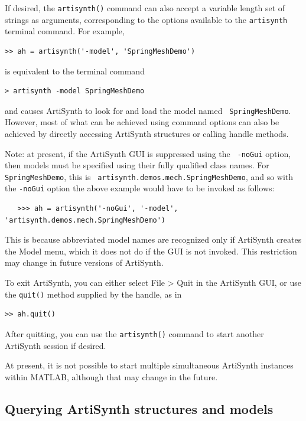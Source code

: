 \documentclass{article}
\begin{document}
If desired, the {\tt artisynth()} command can also accept a variable
length set of strings as arguments, corresponding to the
options available to the {\tt artisynth} terminal command.  For
example,
%
\begin{lstlisting}[]
  >> ah = artisynth('-model', 'SpringMeshDemo')
\end{lstlisting}
%
is equivalent to the terminal command
%
\begin{lstlisting}[]
  > artisynth -model SpringMeshDemo
\end{lstlisting}
%
and causes ArtiSynth to look for and load the model named {\tt
SpringMeshDemo}. However, most of what can be achieved using command
options can also be achieved by directly accessing ArtiSynth
structures or calling handle methods.

%
\begin{sideblock}
Note: at present, if the ArtiSynth GUI is suppressed using the {\tt
-noGui} option, then models must be specified using their fully
qualified class names. For {\tt SpringMeshDemo}, this is {\tt
artisynth.demos.mech.SpringMeshDemo}, and so with the {\tt -noGui}
option the above example would have to be invoked as follows:
%
\begin{verbatim}
   >>> ah = artisynth('-noGui', '-model', 'artisynth.demos.mech.SpringMeshDemo')
\end{verbatim}
%
This is because abbreviated model names are recognized only if
ArtiSynth creates the {\sf Model} menu, which it does not do if the
GUI is not invoked. This restriction may change in future versions of
ArtiSynth.
\end{sideblock}
%

To exit ArtiSynth, you can either select {\sf File > Quit} in the
ArtiSynth GUI, or use the {\tt quit()} method supplied by the handle,
as in
%
\begin{lstlisting}[]
  >> ah.quit()
\end{lstlisting}
%

After quitting, you can use the {\tt artisynth()} command to start
another ArtiSynth session if desired.

\begin{sideblock}
At present, it is not possible to start multiple simultaneous
ArtiSynth instances within MATLAB, although that may change in the
future.
\end{sideblock}

\subsection{Querying ArtiSynth structures and models}
\label{MatlabQuerying:sec}
\end{document}
